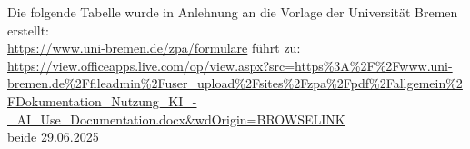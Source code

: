 Die folgende Tabelle wurde in Anlehnung an die Vorlage der Universität Bremen erstellt:
\\

\footnotesize{
    \url{https://www.uni-bremen.de/zpa/formulare} führt zu: 
    \\

    \url{https://view.officeapps.live.com/op/view.aspx?src=https%3A%2F%2Fwww.uni-bremen.de%2Ffileadmin%2Fuser_upload%2Fsites%2Fzpa%2Fpdf%2Fallgemein%2FDokumentation_Nutzung_KI_-_AI_Use_Documentation.docx&wdOrigin=BROWSELINK} 
    \\
    
    beide 29.06.2025
    }

\clearpage
\newpage


